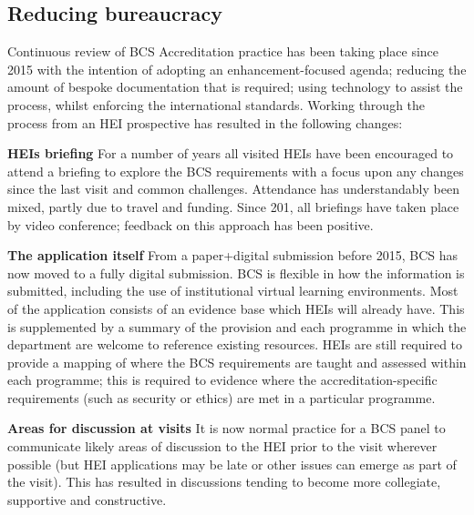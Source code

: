 \documentclass[sigconf]{acmart}
\begin{document}
\subsection{Reducing bureaucracy}

Continuous review of BCS Accreditation practice has been taking place
since 2015 with the intention of adopting an enhancement-focused
agenda; reducing the amount of bespoke documentation that is required;
using technology to assist the process, whilst enforcing the
international standards. Working through the process from an HEI
prospective has resulted in the following changes:

{\textbf{HEIs briefing}} For a number of years all visited HEIs have
been encouraged to attend a briefing to explore the BCS requirements
with a focus upon any changes since the last visit and common
challenges. Attendance has understandably been mixed, partly due to
travel and funding. Since 201, all briefings have taken place by video
conference; feedback on this approach has been positive.

{\textbf{The application itself}} From a paper+digital submission
before 2015, BCS has now moved to a fully digital submission. BCS is
flexible in how the information is submitted, including the use of
institutional virtual learning environments. Most of the application
consists of an evidence base which HEIs will already have. This is
supplemented by a summary of the provision and each programme in which
the department are welcome to reference existing resources. HEIs are
still required to provide a mapping of where the BCS requirements are
taught and assessed within each programme; this is required to
evidence where the accreditation-specific requirements (such as
security or ethics) are met in a particular programme.

{\textbf{Areas for discussion at visits}} It is now normal practice
for a BCS panel to communicate likely areas of discussion to the HEI
prior to the visit wherever possible (but HEI applications may be late
or other issues can emerge as part of the visit).  This has resulted
in discussions tending to become more collegiate, supportive and
constructive.

\end{document}
